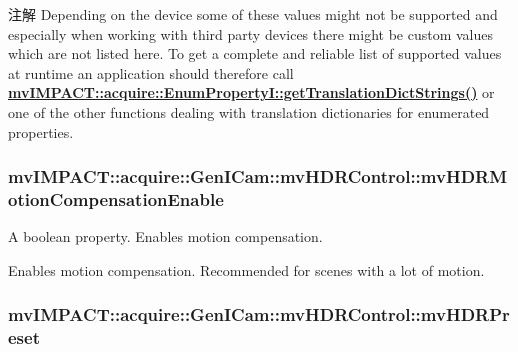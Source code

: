 \begin{DoxyNote}{注解}
Depending on the device some of these values might not be supported and especially when working with third party devices there might be custom values which are not listed here. To get a complete and reliable list of supported values at runtime an application should therefore call {\bfseries \hyperlink{classmv_i_m_p_a_c_t_1_1acquire_1_1_enum_property_i_a0ba6ccbf5ee69784d5d0b537924d26b6}{mv\+I\+M\+P\+A\+C\+T\+::acquire\+::\+Enum\+Property\+I\+::get\+Translation\+Dict\+Strings()}} or one of the other functions dealing with translation dictionaries for enumerated properties. 
\end{DoxyNote}
\hypertarget{classmv_i_m_p_a_c_t_1_1acquire_1_1_gen_i_cam_1_1mv_h_d_r_control_a4f7203aa89d71498b98bc2d2c804d92c}{
\subsubsection[{mv\+H\+D\+R\+Motion\+Compensation\+Enable}]{ mv\+I\+M\+P\+A\+C\+T\+::acquire\+::\+Gen\+I\+Cam\+::mv\+H\+D\+R\+Control\+::mv\+H\+D\+R\+Motion\+Compensation\+Enable}}\label{classmv_i_m_p_a_c_t_1_1acquire_1_1_gen_i_cam_1_1mv_h_d_r_control_a4f7203aa89d71498b98bc2d2c804d92c}


A boolean property. Enables motion compensation. 

Enables motion compensation. Recommended for scenes with a lot of motion. \hypertarget{classmv_i_m_p_a_c_t_1_1acquire_1_1_gen_i_cam_1_1mv_h_d_r_control_a905f7beff8d8e7bcf570cc5183a59726}{
\subsubsection[{mv\+H\+D\+R\+Preset}]{ mv\+I\+M\+P\+A\+C\+T\+::acquire\+::\+Gen\+I\+Cam\+::mv\+H\+D\+R\+Control\+::mv\+H\+D\+R\+Preset}}\label{classmv_i_m_p_a_c_t_1_1acquire_1_1_gen_i_cam_1_1mv_h_d_r_control_a905f7beff8d8e7bcf570cc5183a59726}


